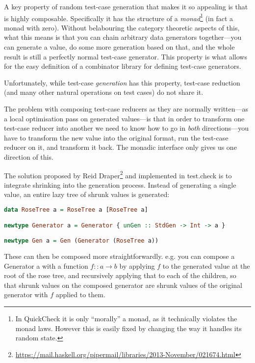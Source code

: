 A key property of random test-case generation that makes it so appealing is that is highly composable.
Specifically it has the structure of a \emph{monad}\footnote{
In QuickCheck it is only ``morally'' a monad,
as it technically violates the monad laws.
However this is easily fixed by changing the way it handles its random state.
} (in fact a monad with zero).
Without belabouring the category theoretic aspects of this,
what this means is that you can chain arbitrary data generators together---you
can generate a value,
do some more generation based on that,
and the whole result is still a perfectly normal test-case generator.
This property is what allows for the easy definition of a combinator library for defining test-case generators.

Unfortunately,
while test-case \emph{generation} has this property,
test-case reduction (and many other natural operations on test cases) do not share it.

The problem with composing test-case reducers as they are normally written---as
a local optimisation pass on generated values---is
that in order to transform one test-case reducer into another we need to know how to go in \emph{both} directions---you
have to transform the new value into the original format,
run the test-case reducer on it,
and transform it back.
The monadic interface only gives us one direction of this.

The solution proposed by Reid Draper\footnote{\url{https://mail.haskell.org/pipermail/libraries/2013-November/021674.html}}
and implemented in test.check is to integrate shrinking into the generation process.
Instead of generating a single value,
an entire lazy tree of shrunk values is generated:

\begin{lstlisting}[language=Haskell]
data RoseTree a = RoseTree a [RoseTree a]

newtype Generator a = Generator { unGen :: StdGen -> Int -> a }

newtype Gen a = Gen (Generator (RoseTree a))
\end{lstlisting}

These can then be composed more straightforwardly.
e.g. you can compose a Generator a with a function \(f :: a \to b\) by applying \(f\) to the generated value at the root of the rose tree,
and recursively applying that to each of the children,
so that shrunk values on the composed generator are shrunk values of the original generator with \(f\) applied to them.

